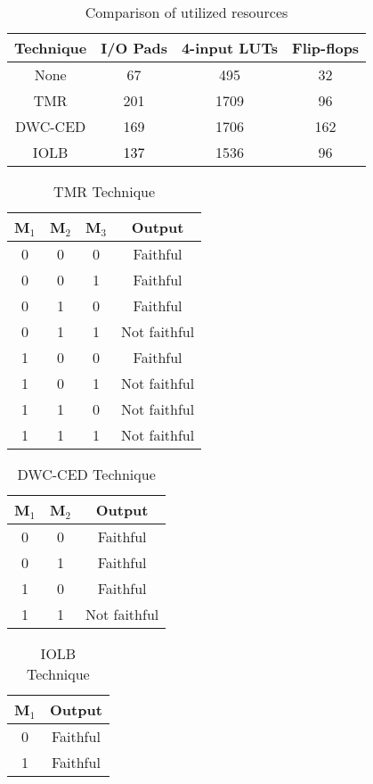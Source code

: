\documentclass[10pt,journal,cspaper,compsoc]{IEEEtran}
\begin{document}
{{\begin{table}[t]
\caption{Comparison of utilized resources} \centering \begin{tabular}{|c| c| c| c|} \hline
Technique & I/O Pads & 4-input LUTs & Flip-flops  \\ [0.5ex] \hline None & 67 & 495 & 32\\
\hline
TMR & 201 & 1709 & 96 \\
\hline
DWC-CED \cite{KNHCR} & 169 & 1706 & 162 \\
\hline
IOLB & \textcolor{black}{137} & 1536 & 96\\[1ex] \hline \end{tabular}
\label{table:nonlin} \end{table}

\begin{table}[t]
\caption{TMR Technique} \centering \begin{tabular}{|c| c| c| c|} \hline
M$_{1}$ & M$_{2}$ & M$_{3}$ & Output  \\ [0.5ex] \hline 0 & 0 & 0 & Faithful \\ 0 & 0 & 1 & Faithful\\
0 & 1 & 0 & Faithful \\
0 & 1 & 1 & Not faithful \\
1 & 0 & 0 & Faithful\\
1 & 0 & 1 & Not faithful \\
1 & 1 & 0 & Not faithful\\
1 & 1 & 1 & Not faithful\\[1ex] \hline \end{tabular}
\label{table:nonlin} \end{table}

\begin{table}[!t]
\caption{DWC-CED Technique} \centering \begin{tabular}{|c| c| c|} \hline
M$_{1}$ & M$_{2}$ & Output  \\ [0.5ex] \hline 0 & 0 & Faithful \\ 0 & 1 & Faithful\\
1 & 0 & Faithful \\
1 & 1 & Not faithful \\ [1ex] \hline \end{tabular}
\label{table:nonlin} \end{table}

\begin{table}[!t]
\caption{IOLB Technique} \centering \begin{tabular}{|c| c|} \hline
M$_{1}$ & Output  \\ [0.5ex] \hline 0 & Faithful \\ 1 & Faithful \\ [1ex] \hline \end{tabular}
\label{table:nonlin} \end{table}



}}
\end{document}
